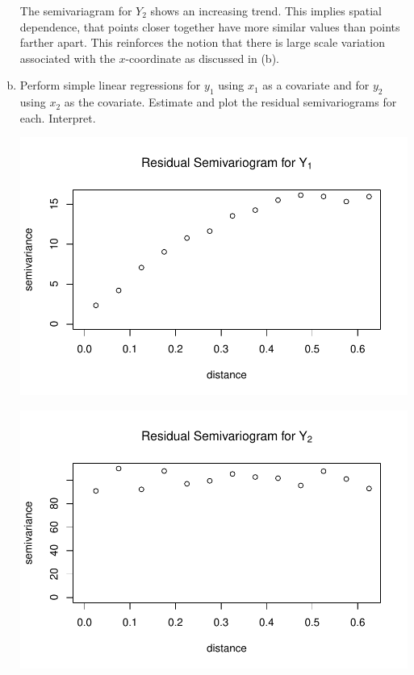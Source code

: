 \documentclass[letterpaper, 12pt]{article}\usepackage[]{graphicx}\usepackage[]{color}
\makeatletter
\def\maxwidth{ %
  \ifdim\Gin@nat@width>\linewidth
    \linewidth
  \else
    \Gin@nat@width
  \fi
}
\newenvironment{knitrout}{}{} %
\makeatother
\begin{document}
\begin{enumerate}[(a)]
{The semivariagram for $Y_2$ shows an increasing trend. This implies spatial dependence, that points closer together have more similar values than points farther apart. This reinforces the notion that there is large scale variation associated with the $x$-coordinate as discussed in (b).}

\item
Perform simple linear regressions for $y_1$ using $x_1$ as a covariate and for $y_2$ using $x_2$ as the covariate. Estimate and plot the residual semivariograms for each. Interpret.

\begin{knitrout}
\color{fgcolor}
\includegraphics[width=\maxwidth]{figure/unnamed-chunk-3} 

\end{knitrout}

\begin{knitrout}
\color{fgcolor}
\includegraphics[width=\maxwidth]{figure/unnamed-chunk-4} 


\end{knitrout}
\end{enumerate}
\end{document}
